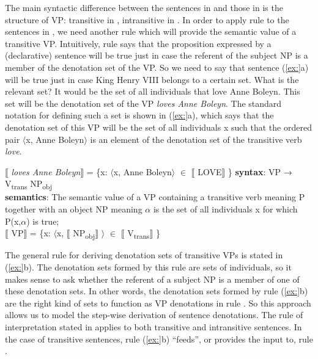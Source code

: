 The main syntactic difference between the sentences in  and those in  is the structure of VP: transitive in , intransitive in . In order to apply rule  to the sentences in , we need another rule which will provide the semantic value of a transitive VP. Intuitively, rule  says that the proposition expressed by a (declarative) sentence will be true just in case the referent of the subject NP is a member of the denotation set of the VP. So we need to say that sentence (\ref{ex:}a) will be true just in case King Henry VIII belongs to a certain set. What is the relevant set? It would be the set of all individuals that love Anne Boleyn. This set will be the denotation set of the VP \textit{loves Anne Boleyn}. The standard notation for defining such a set is shown in (\ref{ex:}a), which says that the denotation set of this VP will be the set of all individuals x such that the ordered pair $\langle$x, Anne Boleyn$\rangle$ is an element of the denotation set of the transitive verb \textit{love}.


\ea
\ea{}  $\llbracket$ \textit{loves Anne Boleyn}$\rrbracket$  = \{x: $\langle$x, Anne Boleyn$\rangle$ ${\in}$ $\llbracket$ LOVE$\rrbracket$ \}
\ex \textbf{syntax}: VP  →  V\textsubscript{trans}  NP\textsubscript{obj}\\
\textbf{semantics}: The semantic value of a VP containing a transitive verb meaning P together with an object NP meaning $\alpha $ is the set of all individuals x for which P(x,$\alpha $) is true;\\
{}$\llbracket$ VP$\rrbracket$  =  \{x: $\langle$x, $\llbracket$ NP\textsubscript{obj}$\rrbracket$ $\rangle$ ${\in}$ $\llbracket$ V\textsubscript{trans}$\rrbracket$ \}
\z \z


The general rule for deriving denotation sets of transitive VPs is stated in (\ref{ex:}b). The denotation sets formed by this rule are sets of individuals, so it makes sense to ask whether the referent of a subject NP is a member of one of these denotation sets. In other words, the denotation sets formed by rule (\ref{ex:}b) are the right kind of sets to function as VP denotations in rule . So this approach allows us to model the step-wise derivation of sentence denotations. The rule of interpretation stated in  applies to both transitive and intransitive sentences. In the case of transitive sentences, rule (\ref{ex:}b) “feeds”, or provides the input to, rule .



